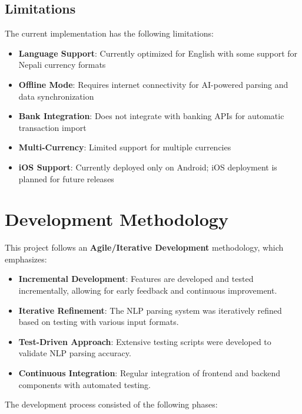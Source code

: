 \subsection{Limitations}

The current implementation has the following limitations:

\begin{itemize}
    \item \textbf{Language Support}: Currently optimized for English with some support for Nepali currency formats
    \item \textbf{Offline Mode}: Requires internet connectivity for AI-powered parsing and data synchronization
    \item \textbf{Bank Integration}: Does not integrate with banking APIs for automatic transaction import
    \item \textbf{Multi-Currency}: Limited support for multiple currencies
    \item \textbf{iOS Support}: Currently deployed only on Android; iOS deployment is planned for future releases
\end{itemize}

\section{Development Methodology}

This project follows an \textbf{Agile/Iterative Development} methodology, which emphasizes:

\begin{itemize}
    \item \textbf{Incremental Development}: Features are developed and tested incrementally, allowing for early feedback and continuous improvement.
    
    \item \textbf{Iterative Refinement}: The NLP parsing system was iteratively refined based on testing with various input formats.
    
    \item \textbf{Test-Driven Approach}: Extensive testing scripts were developed to validate NLP parsing accuracy.
    
    \item \textbf{Continuous Integration}: Regular integration of frontend and backend components with automated testing.
\end{itemize}

The development process consisted of the following phases:

